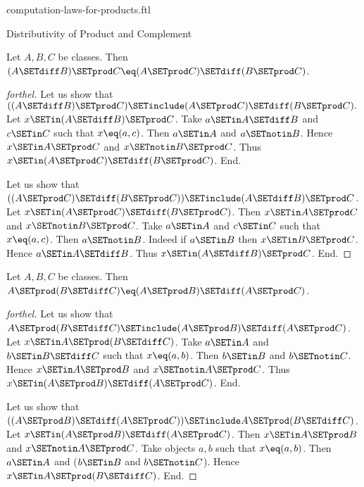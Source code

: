 \documentclass{naproche-library}
\begin{document}
\begin{smodule}[title=Computation Laws for Cartesian Products]{computation-laws-for-products.ftl}
\begin{sfragment}{Distributivity of Product and Complement}
  \begin{proposition}[forthel,id=FOUNDATIONS_05_6495329908162560]
    Let $A, B, C$ be classes.
    Then $(A \SETdiff B) \SETprod C \eq (A \SETprod C) \SETdiff (B \SETprod C)$.
  \end{proposition}
  \begin{proof}[forthel]
    Let us show that $((A \SETdiff B) \SETprod C) \SETinclude (A \SETprod C) \SETdiff (B \SETprod C).$ %
      Let $x \SETin (A \SETdiff B) \SETprod C$.
      Take $a \SETin A \SETdiff B$ and $c \SETin C$ such that $x \eq (a, c)$.
      Then $a \SETin A$ and $a \SETnotin B$.
      Hence $x \SETin A \SETprod C$ and $x \SETnotin B \SETprod C$.
      Thus $x \SETin (A \SETprod C) \SETdiff (B \SETprod C)$.
    End.

    Let us show that $((A \SETprod C) \SETdiff (B \SETprod C)) \SETinclude (A \SETdiff B) \SETprod C$. %
      Let $x \SETin (A \SETprod C) \SETdiff (B \SETprod C)$.
      Then $x \SETin A \SETprod C$ and $x \SETnotin B \SETprod C$.
      Take $a \SETin A$ and $c \SETin C$ such that $x \eq (a, c)$.
      Then $a \SETnotin B$.
      Indeed if $a \SETin B$ then $x \SETin B \SETprod C$.
      Hence $a \SETin A \SETdiff B$.
      Thus $x \SETin (A \SETdiff B) \SETprod C$.
    End.
  \end{proof}

  \begin{proposition}[forthel,id=FOUNDATIONS_05_3195639422779392]
    Let $A, B, C$ be classes.
    Then $A \SETprod (B \SETdiff C) \eq (A \SETprod B) \SETdiff (A \SETprod C)$.
  \end{proposition}
  \begin{proof}[forthel]
    Let us show that $A \SETprod (B \SETdiff C) \SETinclude (A \SETprod B) \SETdiff (A \SETprod C)$.
      Let $x \SETin A \SETprod (B \SETdiff C)$.
      Take $a \SETin A$ and $b \SETin B \SETdiff C$ such that $x \eq (a, b)$.
      Then $b \SETin B$ and $b \SETnotin C$.
      Hence $x \SETin A \SETprod B$ and $x \SETnotin A \SETprod C$.
      Thus $x \SETin (A \SETprod B) \SETdiff (A \SETprod C)$.
    End.

    Let us show that $((A \SETprod B) \SETdiff (A \SETprod C)) \SETinclude A \SETprod (B \SETdiff C)$. %
      Let $x \SETin (A \SETprod B) \SETdiff (A \SETprod C)$.
      Then $x \SETin A \SETprod B$ and $x \SETnotin A \SETprod C$.
      Take objects $a, b$ such that $x \eq (a, b)$.
      Then $a \SETin A$ and ($b \SETin B$ and $b \SETnotin C$).
      Hence $x \SETin A \SETprod (B \SETdiff C)$.
    End.
  \end{proof}
\end{sfragment}


\end{smodule}
\end{document}
